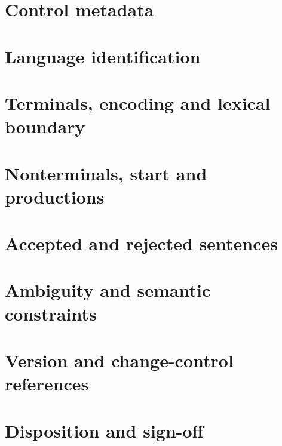 \documentclass[11pt,letterpaper]{article}
\begin{document}
\makedoctitle\makedocsummary
\section{Control metadata}
\section{Language identification}
\section{Terminals, encoding and lexical boundary}
\section{Nonterminals, start and productions}
\section{Accepted and rejected sentences}
\section{Ambiguity and semantic constraints}
\section{Version and change-control references}
\section{Disposition and sign-off}
\end{document}
